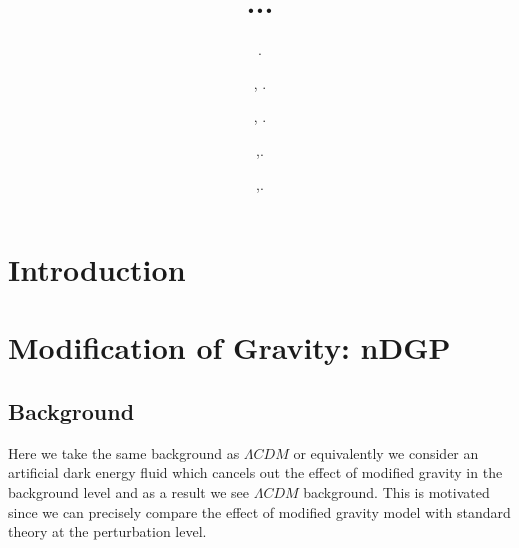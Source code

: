 \documentclass[a4paper,10pt]{article}
\title{... }
\author[a]{.}
\author[b]{, .}
\author[c]{, .}
\author[d]{,.}
\author[e]{,.}
\begin{document}
\maketitle
\section{Introduction}
\section{Modification of Gravity: nDGP }
\subsection{Background}
Here we take the same background as $\Lambda CDM$ or equivalently we consider an artificial dark energy fluid which cancels out the effect of modified gravity in the background level and as a result we see  $\Lambda CDM $ background. This is motivated since we can precisely compare the effect of modified gravity model with standard theory at the perturbation level.
\end{document}
